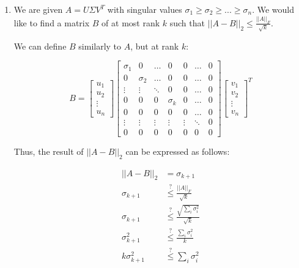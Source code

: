 \documentclass[11pt]{article}
\theoremstyle{definition}
\theoremstyle{case}
\theoremstyle{theorem}
\begin{document}
\begin{enumerate}[label=(\alph*)]

\item We are given $A = U \Sigma V^T$ with singular values $\sigma_1 \geq \sigma_2 \geq ... \geq \sigma_n$. We would like to find a matrix $B$ 
of at most rank $k$ such that $||A - B||_2 \leq \frac{||A||_F}{\sqrt{k}}$. 

We can define $B$ similarly to $A$, but at rank $k$:

\[
  B = 
  \begin{bmatrix}
    u_1 \\
    u_2 \\
    \vdots \\
    u_n
  \end{bmatrix} 
  \left[
    \begin{array}{ccccccc}
      \sigma_1 & 0        & \hdots & 0        & 0      & \hdots  & 0 \\
      0        & \sigma_2 & \hdots & 0        & 0      & \hdots  & 0 \\
      \vdots   & \vdots   & \ddots & 0        & 0      & \hdots  & 0 \\
      0        & 0        & 0      & \sigma_k & 0      & \hdots  & 0 \\
      0        & 0        & 0      & 0        & 0      & \hdots  & 0 \\
      \vdots   & \vdots   & \vdots & \vdots   & \vdots & \ddots  & 0 \\
      0        & 0        & 0      & 0        & 0      & 0       & 0 
    \end{array}
  \right]
  \begin{bmatrix}
    v_1 \\
    v_2 \\
    \vdots \\
    v_n
  \end{bmatrix}^T
\]

Thus, the result of $||A - B||_2$ can be expressed as follows:

\begin{align*}
  ||A - B||_2 &= \sigma_{k+1} \\
  \sigma_{k+1} &\stackrel{?}{\leq} \frac{||A||_F}{\sqrt{k}} \\
  \sigma_{k+1} &\stackrel{?}{\leq} \frac{\sqrt{\sum_i \sigma_i^2}}{\sqrt{k}} \\
  \sigma_{k+1}^2 &\stackrel{?}{\leq} \frac{\sum_i \sigma_i^2}{k} \\
  k \sigma_{k+1}^2 &\stackrel{?}{\leq} \sum_i \sigma_i^2
\end{align*} 


\end{enumerate}
\end{document}
